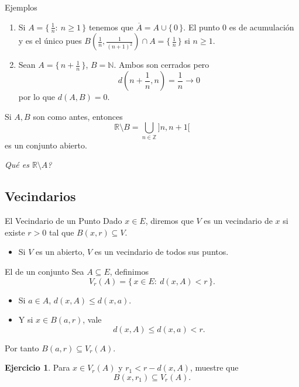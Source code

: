 \documentclass[utf8]{beamer}
\theoremstyle{plain}
\theoremstyle{definition}
\newtheorem{Ej}{Ejercicio}             %
\theoremstyle{remark}
\numberwithin{equation}{section}
\newcommand{\bN}{\mathbb{N}}    %
\newcommand{\bR}{\mathbb{R}}    %
\newcommand{\bZ}{\mathbb{Z}}    %
\newcommand{\set}[1]{\{\,#1\,\}}    %
\newcommand{\Set}[1]{\biggl\{\,#1\,\biggr\}} %
\renewcommand{\geq}{\geqslant}          %
\renewcommand{\leq}{\leqslant}          %
\newcommand{\less}{\setminus}           %
\newcommand{\ov}{\overline}
\begin{document}
\begin{frame}{Ejemplos}
    \begin{enumerate}
        \item Si $A=\Set{\frac1n:\ n\geq 1}$ tenemos que $\ov A=A\cup\set0$. El punto 0 es de acumulaci\'on y es el \'unico pues $B\left(\frac 1n,\frac{1}{(n+1)^2}\right)\cap A=\set{\frac1n}$ si $n\geq 1$.
        \item Sean $A=\Set{n+\frac1n}$, $B=\bN$. Ambos son cerrados pero 
        $$d\left(n+\frac1n,n\right)=\frac{1}{n}\to 0$$
        por lo que $d(A,B)=0$.
    \end{enumerate}
    
\end{frame}

\begin{frame}
    Si $A,B$ son como antes, entonces 
    $$\bR\less B=\bigcup_{n\in\bZ}]n,n+1[$$
    es un conjunto abierto. 
    \begin{center}
        \emph{Qu\'e es $\bR\less A$?}
    \end{center}
\end{frame}


\subsection{Vecindarios}

\begin{frame}{El Vecindario de un Punto} %
Dado $x\in E$, diremos que $V$ es un \alert{vecindario} de $x$ si existe $r>0$ tal que $B(x,r)\subseteq V$.\par 
\begin{itemize}
    \item Si $V$ es un abierto, $V$ es un vecindario de todos sus puntos.
\end{itemize}

\end{frame}

\begin{frame}{El de un conjunto}
    Sea $A\subseteq E$, definimos 
    $$V_r(A)=\set{x\in E:\ d(x,A)<r}.$$
    \begin{itemize}
        \item Si $a\in A$, $d(x,A)\leq d(x,a)$. 
        \item Y si $x\in B(a,r)$, vale
        $$d(x,A)\leq d(x,a)<r.$$
    \end{itemize}
    Por tanto $B(a,r)\subseteq V_r(A)$.
    \begin{Ej}\label{ej:bolasEnVecindarios}
        Para $x\in V_r(A)$ y $r_1<r-d(x,A)$, muestre que 
        $$B(x,r_1)\subseteq V_r(A).$$
    \end{Ej}
    
\end{frame}
\end{document}
